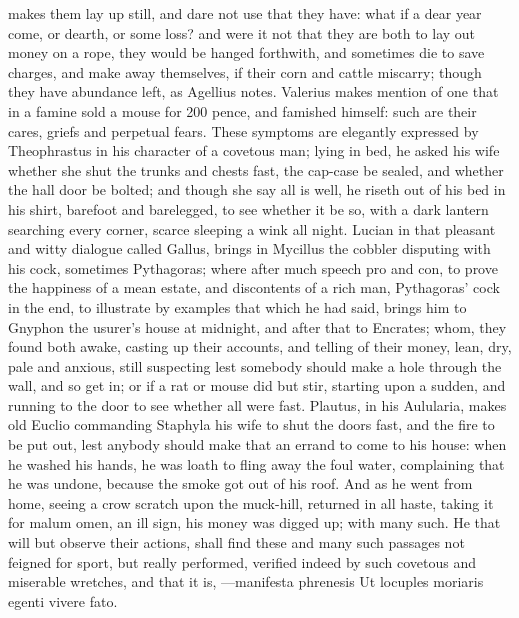 {makes them lay up still, and dare not use that they have: what if a
dear year come, or dearth, or some loss? and were it not that they are
both to lay out money on a rope, they would be hanged forthwith,
and sometimes die to save charges, and make away themselves, if their
corn and cattle miscarry; though they have abundance left, as
Agellius notes. Valerius makes mention of one that in a
famine sold a mouse for 200 pence, and famished himself: such are their
cares, griefs and perpetual fears. These symptoms are elegantly
expressed by Theophrastus in his character of a covetous man;
lying in bed, he asked his wife whether she shut the trunks and
chests fast, the cap-case be sealed, and whether the hall door be
bolted; and though she say all is well, he riseth out of his bed in his
shirt, barefoot and barelegged, to see whether it be so, with a dark
lantern searching every corner, scarce sleeping a wink all night.
Lucian in that pleasant and witty dialogue called Gallus, brings in
Mycillus the cobbler disputing with his cock, sometimes Pythagoras;
where after much speech pro and con, to prove the happiness of a mean
estate, and discontents of a rich man, Pythagoras' cock in the end, to
illustrate by examples that which he had said, brings him to Gnyphon
the usurer's house at midnight, and after that to Encrates; whom, they
found both awake, casting up their accounts, and telling of their
money, lean, dry, pale and anxious, still suspecting lest
somebody should make a hole through the wall, and so get in; or if a
rat or mouse did but stir, starting upon a sudden, and running to the
door to see whether all were fast. Plautus, in his Aulularia, makes old
Euclio commanding Staphyla his wife to shut the doors fast, and
the fire to be put out, lest anybody should make that an errand to come
to his house: when he washed his hands, he was loath to fling
away the foul water, complaining that he was undone, because the smoke
got out of his roof. And as he went from home, seeing a crow scratch
upon the muck-hill, returned in all haste, taking it for malum omen, an
ill sign, his money was digged up; with many such. He that will but
observe their actions, shall find these and many such passages not
feigned for sport, but really performed, verified indeed by such
covetous and miserable wretches, and that it is,
---manifesta phrenesis
Ut locuples moriaris egenti vivere fato.

}
